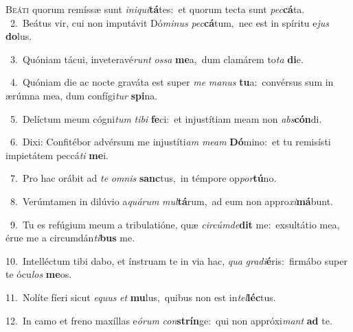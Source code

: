 \lettrine{\initial\textcolor{\initialcolor}{B}}{eáti} quorum remíssæ sunt \textit{in}\-\textit{i}\textit{qui}\textbf{tá}tes:~\star et quorum tecta sunt \textit{pec}\-\textbf{cá}ta.\\
{\numbfont\textcolor{\numbcolor}{~2.}}~Beátus vir, cui non imputávit Dó\-\textit{mi}\-\textit{nus} \textit{pec}\-\textbf{cá}tum,~\star nec est in spíritu e\textit{jus} \textbf{do}\-lus.\par
{\numbfont\textcolor{\numbcolor}{~3.}}~Quóniam tácui, inveteravé\textit{runt} \textit{os}\-\textit{sa} \textbf{me}\-a,~\star dum clamárem to\textit{ta} \textbf{di}\-e.\par
{\numbfont\textcolor{\numbcolor}{~4.}}~Quóniam die ac nocte graváta est super \textit{me} \textit{ma}\-\textit{nus} \textbf{tu}\-a:~\star convérsus sum in ærúmna mea, dum confígi\textit{tur} \textbf{spi}\-na.\par
{\numbfont\textcolor{\numbcolor}{~5.}}~Delíctum meum cógni\textit{tum} \textit{ti}\-\textit{bi} \textbf{fe}\-ci:~\star et injustítiam meam non \textit{abs}\-\textbf{cón}di.\par
{\numbfont\textcolor{\numbcolor}{~6.}}~Dixi: Confitébor advérsum me injustíti\textit{am} \textit{me}\-\textit{am} \textbf{Dó}\-mino:~\star et tu remisísti impietátem peccá\textit{ti} \textbf{me}\-i.\par
{\numbfont\textcolor{\numbcolor}{~7.}}~Pro hac orábit ad \textit{te} \textit{om}\-\textit{nis} \textbf{sanc}\-tus,~\star in témpore op\-\textit{por}\-\textbf{tú}no.\par
{\numbfont\textcolor{\numbcolor}{~8.}}~Verúmtamen in dilúvio a\-\textit{quá}\-\textit{rum} \textit{mul}\-\textbf{tá}rum,~\star ad eum non appro\-\textit{xi}\-\textbf{má}bunt.\par
{\numbfont\textcolor{\numbcolor}{~9.}}~Tu es refúgium meum a tribulatióne, quæ \textit{cir}\-\textit{cúm}\textit{de}\textbf{dit} me:~\star exsultátio mea, érue me a circumdán\-\textit{ti}\-\textbf{bus} me.\par
{\numbfont\textcolor{\numbcolor}{10.}}~Intelléctum tibi dabo, et ínstruam te in via hac, \textit{qua} \textit{gra}\-\textit{di}\textbf{é}ris:~\star firmábo super te ócu\textit{los} \textbf{me}\-os.\par
{\numbfont\textcolor{\numbcolor}{11.}}~Nolíte fíeri sicut \textit{e}\-\textit{quus} \textit{et} \textbf{mu}\-lus,~\star quibus non est in\-\textit{tel}\-\textbf{léc}tus.\par
{\numbfont\textcolor{\numbcolor}{12.}}~In camo et freno maxíllas e\-\textit{ó}\-\textit{rum} \textit{con}\-\textbf{strín}ge:~\star qui non appróxi\textit{mant} \textbf{ad} te.\par
